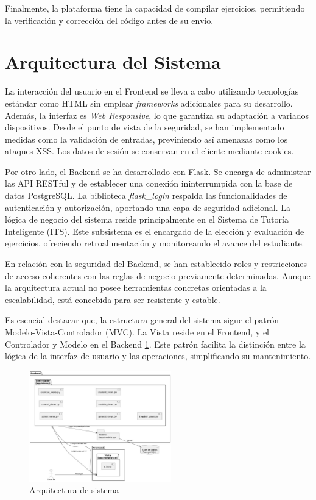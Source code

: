 Finalmente, la plataforma tiene la capacidad de compilar ejercicios, permitiendo la verificación y corrección del código antes de su envío.

\section{Arquitectura del Sistema}

La interacción del usuario en el Frontend se lleva a cabo utilizando tecnologías estándar como HTML sin emplear \textit{frameworks} adicionales para su desarrollo. Además, la interfaz es \textit{Web Responsive}, lo que garantiza su adaptación a variados dispositivos. Desde el punto de vista de la seguridad, se han implementado medidas como la validación de entradas, previniendo así amenazas como los ataques XSS. Los datos de sesión se conservan en el cliente mediante cookies.

Por otro lado, el Backend se ha desarrollado con Flask. Se encarga de administrar las API RESTful y de establecer una conexión ininterrumpida con la base de datos PostgreSQL. La biblioteca \textit{flask\_login} respalda las funcionalidades de autenticación y autorización, aportando una capa de seguridad adicional. La lógica de negocio del sistema reside principalmente en el Sistema de Tutoría Inteligente (ITS). Este subsistema es el encargado de la elección y evaluación de ejercicios, ofreciendo retroalimentación y monitoreando el avance del estudiante.

En relación con la seguridad del Backend, se han establecido roles y restricciones de acceso coherentes con las reglas de negocio previamente determinadas. Aunque la arquitectura actual no posee herramientas concretas orientadas a la escalabilidad, está concebida para ser resistente y estable.

Es esencial destacar que, la estructura general del sistema sigue el patrón Modelo-Vista-Controlador (MVC). La Vista reside en el Frontend, y el Controlador y Modelo en el Backend \ref{fig:arqsistema}. Este patrón facilita la distinción entre la lógica de la interfaz de usuario y las operaciones, simplificando su mantenimiento.

\begin{figure}[H]
    \centering
    \includegraphics[width=0.55\textwidth]{imagenes/ArquitecturaDeSistema.jpeg}
    
    \caption{Arquitectura de sistema}
    \label{fig:arqsistema}
\end{figure}

